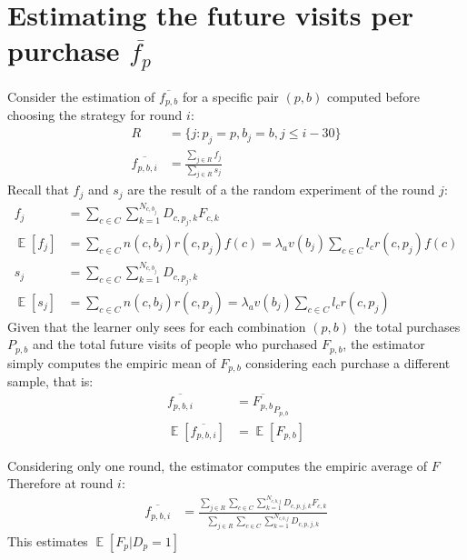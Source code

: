 \documentclass[11pt]{article} %
\DeclareMathOperator{\EX}{\mathbb{E}}
\begin{document}
{\color{red}
\section{Estimating the future visits per purchase $\overline{f_p}$}\label{sec.futureVisitsOk}
Consider the estimation of $\overline{f_{p,b}}$ for a specific pair $(p,b)$ computed before choosing the strategy for round $i$:
\begin{align*}
R&=\{j:p_j=p,b_j=b, j\le i-30\}\\
\overline{f_{p,b,i}}&=\frac{\sum_{j\in R}{f_j}}{\sum_{j\in R}{s_j}}
\end{align*}
Recall that $f_j$ and $s_j$ are the result of a the random experiment of the round $j$:
\begin{align*}
f_j&=\sum_{c \in C}{\sum_{k =1}^{N_{c,b_j}}{D_{c,p_j,k}F_{c,k}}}\\
\EX[f_j]&=\sum_{c \in C}{n(c,b_j)r(c,p_j)f(c)}=\lambda_av(b_j)\sum_{c \in C}{l_cr(c,p_j)f(c)}\\
s_j&=\sum_{c \in C}{\sum_{k =1}^{N_{c,b_j}}{D_{c,p_j,k}}}\\
\EX[s_j]&=\sum_{c \in C}{n(c,b_j)r(c,p_j)}=\lambda_av(b_j)\sum_{c \in C}{l_cr(c,p_j)}
\end{align*}
Given that the learner only sees for each combination $(p,b)$ the total purchases $P_{p,b}$ and the total future visits of people who purchased $F_{p,b}$, the estimator simply computes the empiric mean of $F_{p,b}$ considering each purchase a different sample, that is:
\begin{align*}
\overline{f_{p,b,i}}&=\overline{F_{p,b}}_{P_{p,b}}\\
\EX[\overline{f_{p,b,i}}]&=\EX[F_{p,b}]
\end{align*}

Considering only one round, the estimator computes the empiric average of $F$
Therefore at round $i$:
\begin{align*}
\overline{f_{p,b,i}}&=\frac{\sum_{j\in R}{\sum_{c \in C}{\sum_{k =1}^{N_{c,b,j}}{D_{c,p,j,k}F_{c,k}}}}}{\sum_{j\in R}{\sum_{c \in C}{\sum_{k =1}^{N_{c,b,j}}{D_{c,p,j,k}}}}}
\end{align*}
This estimates $\EX[F_p | D_p = 1]$
}
\end{document}
